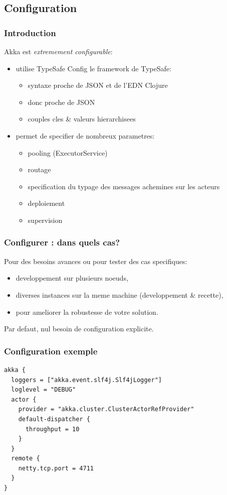 \documentclass[xcolor=dvipsnames]{beamer}
\begin{document}
\subsection{Configuration}
\begin{frame}
  \frametitle{Introduction}
  Akka est \textit{extremement configurable}:
  \begin{itemize}
  \item utilise TypeSafe Config le framework de TypeSafe:
    \begin{itemize}
    \item syntaxe proche de JSON et de l'EDN Clojure
    \item donc proche de JSON
    \item couples cles \& valeurs hierarchisees
    \end{itemize}
  \item permet de specifier de nombreux parametres:
    \begin{itemize}
    \item pooling (ExecutorService)
    \item routage
    \item specification du typage des messages achemines sur les acteurs
    \item deploiement
    \item supervision
    \end{itemize}
  \end{itemize}
\end{frame}

  \begin{frame}
    \frametitle{Configurer : dans quels cas?}
    Pour des besoins avances ou pour tester des cas specifiques:
    \begin{itemize}
    \item developpement sur plusieurs noeuds,
    \item diverses instances sur la meme machine (developpement \& recette),
    \item pour ameliorer la robustesse de votre solution.
    \end{itemize}
    Par defaut, nul besoin de configuration explicite.
  \end{frame}

  \begin{frame}[fragile]
    \frametitle{Configuration exemple}
    \begin{lstlisting}[frame=trBL]
akka {
  loggers = ["akka.event.slf4j.Slf4jLogger"]
  loglevel = "DEBUG"
  actor {
    provider = "akka.cluster.ClusterActorRefProvider"
    default-dispatcher {
      throughput = 10
    }
  }
  remote {
    netty.tcp.port = 4711
  }
}
\end{lstlisting}
\end{frame}
\end{document}
